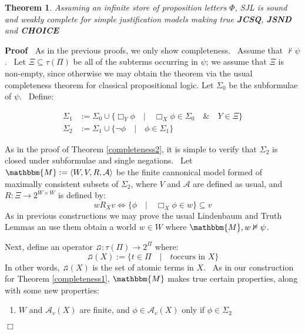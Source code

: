 \documentclass{acmconf}
\newcommand{\assign}{:=}
\newcommand{\tmtextbf}[1]{{\bfseries{#1}}}
\newenvironment{enumeratenumeric}{\begin{enumerate}[1.] }{\end{enumerate}}
\newenvironment{proof}{\noindent\textbf{Proof\ }}{\hspace*{\fill}$\Box$\medskip}
\newtheorem{theorem}{Theorem}
\begin{document}
\begin{theorem}
  \label{completeness5}Assuming an infinite store of proposition letters
  $\Phi$, SJL is sound and weakly complete for simple justification models
  making true \tmtextbf{JCSQ}, \tmtextbf{JSND} and \tmtextbf{CHOICE}
\end{theorem}

\begin{proof}
  As in the previous proofs, we only show completeness. \ Assume that $\nvdash
  \psi$. \ Let $\Xi \subseteq \tau (\Pi)$ be all of the subterms occurring in
  $\psi$; we assume that $\Xi$ is non-empty, since otherwise we may obtain the
  theorem via the usual completeness theorem for classical propositional
  logic. Let $\Sigma_0$ be the subformulae of $\psi$. \ Define:
  
  \begin{align*}
    {\Sigma}_1 &
    {\assign}{\Sigma}_0{\cup}\{\Box_Y{\phi}{\hspace{1em}}|{\hspace{1em}}\Box_X{\phi}{\in}{\Sigma}_0{\hspace{1em}}\&{\hspace{1em}}Y{\in}{\Xi}\}\\
    {\Sigma}_2 &
    {\assign}{\Sigma}_1{\cup}\{{\neg}{\phi}{\hspace{1em}}|{\hspace{1em}}{\phi}{\in}{\Sigma}_1\}
  \end{align*}
  
  As in the proof of Theorem \ref{completeness2}, it is simple to verify that
  $\Sigma_2$ is closed under subformulae and single negations. \ Let
  $\mathbbm{M} \assign \langle W, V, R, \mathcal{A} \rangle$ be the finite
  cannonical model formed of maximally consistent subsets of $\Sigma_2$, where
  $V$ and $\mathcal{A}$ are defined as usual, and $R : \Xi \rightarrow 2^{W
  \times W}$ is defined by:
  \[ w R_X v \Longleftrightarrow \{\phi \hspace{1em} | \hspace{1em} \Box_X
     \phi \in w\} \subseteq v \]
  As in previous constructions we may prove the usual Lindenbaum and Truth
  Lemmas an use them obtain a world $w \in W$ where $\mathbbm{M}, w \nvDash
  \psi$.
  
  
  
  Next, define an operator $\twonotes : \tau (\Pi) \rightarrow 2^{\Pi}$ where:
  \[ \twonotes (X) \assign \{t \in \Pi \hspace{1em} | \hspace{1em} t \text{
     occurs in } X\} \]
  In other words, $\twonotes (X)$ is the set of atomic terms in $X$. \ As in
  our construction for Theorem \ref{completeness1}, $\mathbbm{M}$ makes true
  certain properties, along with some new properties:
  \begin{enumeratenumeric}
    \item \label{fin}$W$ and $\mathcal{A}_v (X)$ are finite, and $\phi \in
    \mathcal{A}_v (X)$ only if $\phi \in \Sigma_2$
    

\end{enumeratenumeric}
\end{proof}
\end{document}
